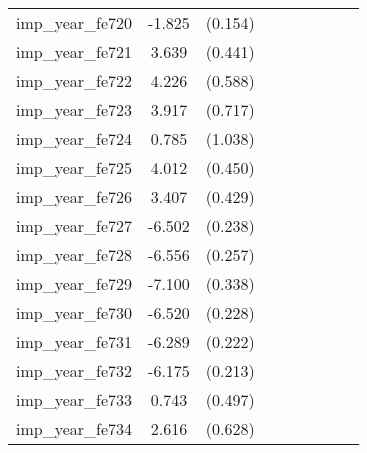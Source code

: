 {\begin{tabular}{l*{4}{cc}}
imp\_year\_fe720&   -1.825\sym{***}&  (0.154)&                  &         &                  &         &                  &         \\
imp\_year\_fe721&    3.639\sym{***}&  (0.441)&                  &         &                  &         &                  &         \\
imp\_year\_fe722&    4.226\sym{***}&  (0.588)&                  &         &                  &         &                  &         \\
imp\_year\_fe723&    3.917\sym{***}&  (0.717)&                  &         &                  &         &                  &         \\
imp\_year\_fe724&    0.785         &  (1.038)&                  &         &                  &         &                  &         \\
imp\_year\_fe725&    4.012\sym{***}&  (0.450)&                  &         &                  &         &                  &         \\
imp\_year\_fe726&    3.407\sym{***}&  (0.429)&                  &         &                  &         &                  &         \\
imp\_year\_fe727&   -6.502\sym{***}&  (0.238)&                  &         &                  &         &                  &         \\
imp\_year\_fe728&   -6.556\sym{***}&  (0.257)&                  &         &                  &         &                  &         \\
imp\_year\_fe729&   -7.100\sym{***}&  (0.338)&                  &         &                  &         &                  &         \\
imp\_year\_fe730&   -6.520\sym{***}&  (0.228)&                  &         &                  &         &                  &         \\
imp\_year\_fe731&   -6.289\sym{***}&  (0.222)&                  &         &                  &         &                  &         \\
imp\_year\_fe732&   -6.175\sym{***}&  (0.213)&                  &         &                  &         &                  &         \\
imp\_year\_fe733&    0.743         &  (0.497)&                  &         &                  &         &                  &         \\
imp\_year\_fe734&    2.616\sym{***}&  (0.628)&                  &         &                  &         &                  &         \\

\end{tabular}}
